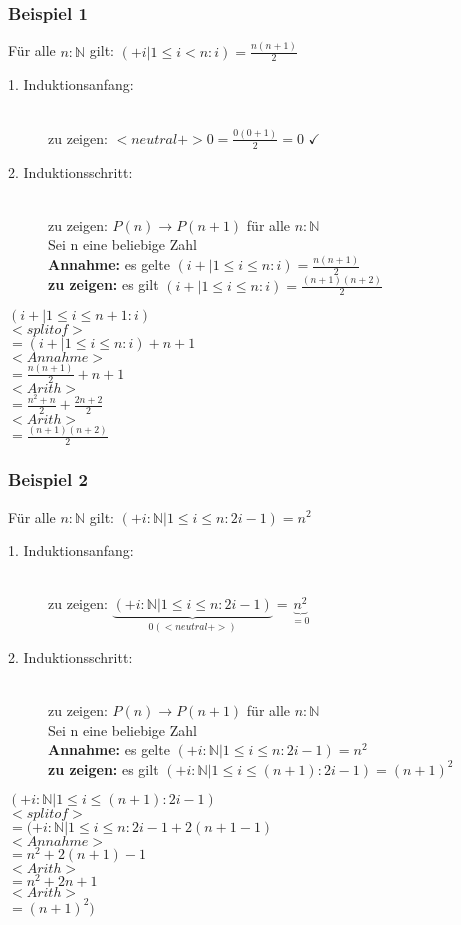 \documentclass[a4paper,10pt]{article}
\newcommand{\NN}{\mathbb{N}} %
\newcommand{\Bold}[1]{\textbf{#1}} %
\newcommand{\ra}{\rightarrow}
\begin{document}
\subsubsection{Beispiel 1}
Für alle $n:\NN$ gilt: $(+ i | 1 \leq i < n : i) = \frac{n(n+1)}{2}$ 
\begin{description}
	\item[1. Induktionsanfang:] \hfill \\
		zu zeigen: $<neutral+>0 = \frac{0(0+1)}{2}=0$ $\checkmark$
	\item[2. Induktionsschritt:] \hfill \\
		zu zeigen: $P(n) \ra P(n+1)$ für alle $n:\NN$ \\
		Sei n eine beliebige Zahl \\
		\Bold {Annahme:} es gelte $(i+|1 \leq i \leq n : i)=\frac{n(n+1)}{2}$ \\
		\Bold {zu zeigen:} es gilt $(i+|1 \leq i \leq n : i)=\frac{(n+1)(n+2)}{2}$ \\
\end{description}
$(i+|1 \leq i \leq n+1 : i)$ \\ $<splitof>$ \\
$=(i+|1 \leq i \leq n : i) + n + 1$ \\ $<Annahme>$ \\
$=\frac{n(n+1)}{2}+n+1$ \\ $<Arith>$ \\
$= \frac{n^2+n}{2} + \frac{2n+2}{2}$ \\ $<Arith>$ \\
$=\frac{(n+1)(n+2)}{2}$

\subsubsection{Beispiel 2}
Für alle $n:\NN$ gilt: $(+ i :\NN| 1 \leq i \leq n : 2i-1) = n^2$ 
\begin{description}
	\item[1. Induktionsanfang:] \hfill \\
		zu zeigen: $\underbrace{(+ i :\NN| 1 \leq i \leq n : 2i-1)}_{0 (<neutral+>)} = \underbrace{n^2}_{=0}$
	\item[2. Induktionsschritt:] \hfill \\
		zu zeigen: $P(n) \ra P(n+1)$ für alle $n:\NN$ \\
		Sei n eine beliebige Zahl \\
		\Bold {Annahme:} es gelte $(+ i :\NN| 1 \leq i \leq n : 2i-1)=n^2$ \\
		\Bold {zu zeigen:} es gilt $(+ i :\NN| 1 \leq i \leq (n+1) : 2i-1)=(n+1)^2$ \\
\end{description}
$(+ i :\NN| 1 \leq i \leq (n+1) : 2i-1)$  \\ $<splitof>$ \\
$=(+ i :\NN| 1 \leq i \leq n : 2i-1 + 2(n+1-1)$ \\ $<Annahme>$ \\
$=n^2 + 2(n+1)-1$ \\ $<Arith>$ \\
$= n^2+2n+1$ \\ $<Arith>$ \\
$=(n+1)^2)$
\end{document}
